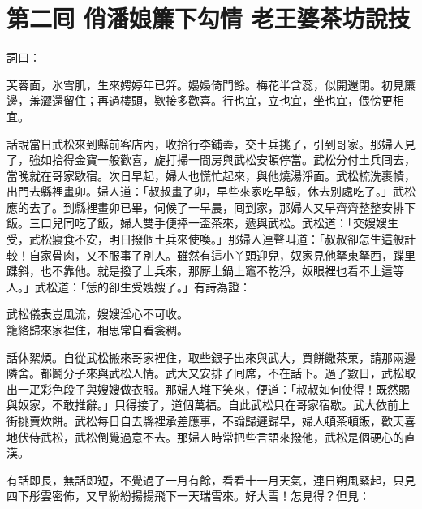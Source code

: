
\chapter*{第二囘 俏潘娘簾下勾情 老王婆茶坊說技}


詞曰：

\begin{myquote}
芙蓉面，氷雪肌，生來娉婷年已笄。嬝嬝倚門餘。梅花半含蕊，似開還閉。初見簾邊，羞澀還留住；{}再過樓頭，欵接多歡喜。行也宜，立也宜，坐也宜，偎傍更相宜。

\end{myquote}

話說當日武松來到縣前客店內，收拾行李鋪蓋，交土兵挑了，引到哥家。那婦人見了，強如拾得金寶一般歡喜，{}旋打掃一間房與武松安頓停當。武松分付土兵囘去，當晚就在哥家歇宿。次日早起，婦人也慌忙起來，與他燒湯淨面。武松梳洗裹幘，出門去縣裡畫卯。婦人道：「叔叔畫了卯，早些來家吃早飯，休去別處吃了。」武松應的去了。到縣裡畫卯已畢，伺候了一早晨，囘到家，那婦人又早齊齊整整安排下飯。三口兒同吃了飯，婦人雙手便捧一盃茶來，遞與武松。武松道：「交嫂嫂生受，武松寢食不安，明日撥個土兵來使喚。」那婦人連聲叫道：「叔叔卻怎生這般計較！自家骨肉，又不服事了別人。{}{}雖然有這小丫頭迎兒，奴家見他拏東拏西，蹀里蹀斜，也不靠他。就是撥了土兵來，那厮上鍋上竈不乾淨，奴眼裡也看不上這等人。」武松道：「恁的卻生受嫂嫂了。」有詩為證：

\begin{myquote}
武松儀表豈風流，嫂嫂淫心不可收。\\
籠絡歸來家裡住，相思常自看衾稠。
\end{myquote}

話休絮煩。自從武松搬來哥家裡住，取些銀子出來與武大，買餅饊茶菓，請那兩邊隣舍。都鬬分子來與武松人情。武大又安排了囘席，不在話下。過了數日，武松取出一疋彩色段子與嫂嫂做衣服。那婦人堆下笑來，便道：「叔叔如何使得！既然賜與奴家，不敢推辭。」只得接了，道個萬福。自此武松只在哥家宿歇。武大依前上街挑賣炊餅。武松每日自去縣裡承差應事，不論歸遲歸早，婦人頓茶頓飯，歡天喜地伏侍武松，武松倒覺過意不去。那婦人時常把些言語來撥他，武松是個硬心的直漢。

有話即長，無話即短，不覺過了一月有餘，看看十一月天氣，連日朔風緊起，只見四下彤雲密佈，又早紛紛揚揚飛下一天瑞雪來。好大雪！怎見得？但見：

